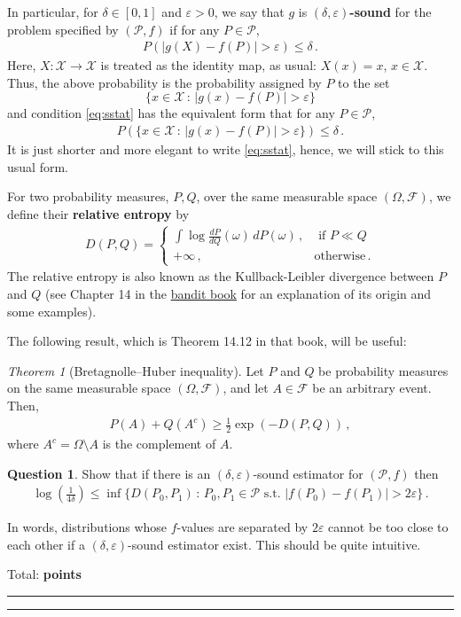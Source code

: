 \documentclass{article}
\newcommand{\cP}{\mathcal{P}}
\newcommand{\cX}{\mathcal{X}}
\DeclareMathOperator*{\1}{\mathbbm{1}}
\newcommand{\cF}{\mathcal{F}}
\newcommand{\0}{\mathbf{0}}
\newcounter{DocPoints} %
\newcounter{QuestionPoints} %
\newcommand{\tpoints}[1]{        %
	\ifthenelse{\isempty{#1}}%
	{%
	}%
	{%
		\addtocounter{DocPoints}{#1}
		\addtocounter{QuestionPoints}{#1}
	}													 %
	\par\mbox{}\par\noindent\hfill {Total: \bf \arabic{QuestionPoints}\xspace points}\par\mbox{}\par\hrule\hrule
	\setcounter{QuestionPoints}{0}
}
\theoremstyle{definition}
\newtheorem{question}{Question}
\theoremstyle{remark}
\theoremstyle{theorem}
\newtheorem{theorem}{Theorem}
\begin{document}
In particular, for $\delta\in [0,1]$ and $\varepsilon>0$, 
we say that $g$ is \textbf{$(\delta,\varepsilon)$-sound} for the problem specified by $(\cP,f)$ if for any $P\in \cP$,
\begin{align}
P( |g(X)-f(P)|>\varepsilon)\le \delta\,.
\label{eq:sstat}
\end{align}
Here, $X:\cX \to \cX$ is treated as the identity map, as usual: $X(x) = x$, $x\in \cX$.
Thus, the above probability is the probability assigned by $P$ to the set 
\[
\{ x\in \cX\,:\, |g(x)-f(P)|>\varepsilon \}
\]
and condition \eqref{eq:sstat} has the equivalent form that for any $P\in \cP$,
\begin{align*}
P(\{ x\in \cX\,:\, |g(x)-f(P)|>\varepsilon \} )\le \delta\,.
\end{align*}
It is just shorter and more elegant to write \cref{eq:sstat}, hence, we will stick to this usual form.

For two probability measures, $P,Q$, over the same measurable space $(\Omega,\cF)$, we define their \textbf{relative entropy} by
\begin{align*}
D(P,Q) =
\begin{cases}
 \int \log \frac{dP}{dQ}(\omega) \, dP(\omega) \,, & \text{ if } P\ll Q\;\\
 +\infty\,, & \text{otherwise}\,.
 \end{cases}
\end{align*}
The relative entropy is also known as the Kullback-Leibler divergence between $P$ and $Q$ (see Chapter 14 in the 
\href{https://tor-lattimore.com/downloads/book/book.pdf}{bandit book} for an explanation of its origin and some examples).

The following result, which is Theorem 14.12 in that book, will be useful:
\newcommand{\KL}{D}
\begin{theorem}[Bretagnolle--Huber inequality]
\label{thm:pinskerhp}
Let $P$ and $Q$ be probability measures on the same measurable space $(\Omega, \cF)$, and let $A \in \cF$ be an arbitrary event. Then,
\begin{align}\label{eq:pinskerhp}
P(A) + Q(A^c) \geq \frac{1}{2} \exp\left(-\KL(P, Q)\right)\,,
\end{align} 
where $A^c = \Omega \setminus A$ is the complement of $A$.
\end{theorem} 


\begin{question}
\label{q:lbcore}
Show that if there is an $(\delta,\varepsilon)$-sound estimator for $(\cP,f)$ then
\begin{align*}
\log\left(\frac{1}{4\delta}\right) \le \inf \{ D(P_0,P_1) \,:\, P_0,P_1\in \cP \text{ s.t. }
|f(P_0)-f(P_1)|>2\varepsilon \} \,.
\end{align*}

In words, distributions whose $f$-values are separated by $2\varepsilon$ cannot be too close to each other  if a $(\delta,\varepsilon)$-sound estimator exist. This should be quite intuitive.
\tpoints{20}
\end{question}
\end{document}
